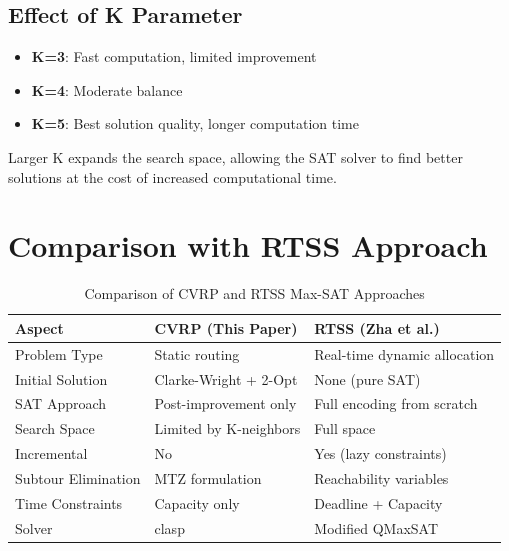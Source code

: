 \documentclass[12pt,a4paper]{article}
\theoremstyle{definition}
\begin{document}
\subsection{Effect of K Parameter}

\begin{itemize}
    \item \textbf{K=3}: Fast computation, limited improvement
    \item \textbf{K=4}: Moderate balance
    \item \textbf{K=5}: Best solution quality, longer computation time
\end{itemize}

Larger K expands the search space, allowing the SAT solver to find better solutions at the cost of increased computational time.

\section{Comparison with RTSS Approach}

\begin{table}[H]
\centering
\begin{tabular}{|l|p{5.5cm}|p{5.5cm}|}
\hline
\textbf{Aspect} & \textbf{CVRP (This Paper)} & \textbf{RTSS (Zha et al.)} \\
\hline
Problem Type & Static routing & Real-time dynamic allocation \\
\hline
Initial Solution & Clarke-Wright + 2-Opt & None (pure SAT) \\
\hline
SAT Approach & Post-improvement only & Full encoding from scratch \\
\hline
Search Space & Limited by K-neighbors & Full space \\
\hline
Incremental & No & Yes (lazy constraints) \\
\hline
Subtour Elimination & MTZ formulation & Reachability variables \\
\hline
Time Constraints & Capacity only & Deadline + Capacity \\
\hline
Solver & clasp & Modified QMaxSAT \\
\hline
\end{tabular}
\caption{Comparison of CVRP and RTSS Max-SAT Approaches}
\end{table}

\end{document}
